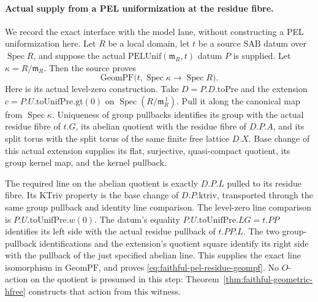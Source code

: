 \paragraph{Actual supply from a PEL uniformization at the residue fibre.}
We record the exact interface with the model lane, without
constructing a PEL uniformization here.
Let \(R\) be a local domain, let \(t\) be a source
\(\mathrm{SAB}\) datum over \(\operatorname{Spec}R\), and
suppose the actual \(\mathrm{PELUnif}(\mathfrak m_R,t)\)
datum \(P\) is supplied.
Let \(\kappa=R/\mathfrak m_R\).
Then the source proves
\[
        \mathrm{GeomPF}
              \bigl(t,\operatorname{Spec}\kappa\to\operatorname{Spec}R\bigr).
 \tag{HF6}\label{eq:faithful-pel-residue-geompf}
\]
Here is its actual level-zero construction.
Take \(D=P.D.\mathrm{toPre}\) and the extension
\(c=P.U.\mathrm{toUnifPre}.\mathrm{gt}(0)\) on
\(\operatorname{Spec}(R/\mathfrak m_R^{\,1})\).
Pull it along the canonical map from \(\operatorname{Spec}\kappa\).
Uniqueness of group pullbacks identifies its group with the
actual residue fibre of \(t.G\), its abelian quotient with
the residue fibre of \(D.P.A\), and its split torus with
the split torus of the same finite free lattice \(D.X\).
Base change of this actual extension supplies its flat,
surjective, quasi-compact quotient, its group kernel map,
and the kernel pullback.

The required line on the abelian quotient is exactly
\(D.P.L\) pulled to its residue fibre.
Its \(\mathrm{KTriv}\) property is the base change of
\(D.P.\mathrm{ktriv}\), transported through the same
group pullback and identity line comparison.
The level-zero line comparison is
\(P.U.\mathrm{toUnifPre}.w(0)\).
The datum's equality
\(P.U.\mathrm{toUnifPre}.LG=t.PP\) identifies its left
side with the actual residue pullback of \(t.PP.L\).
The two group-pullback identifications and the extension's
quotient square identify its right side with the pullback
of the just specified abelian line.
This supplies the exact line isomorphism in
\(\mathrm{GeomPF}\), and proves
\eqref{eq:faithful-pel-residue-geompf}.
No \(O\)-action on the quotient is presumed in this step:
Theorem~\ref{thm:faithful-geometric-hfree} constructs that
action from this witness.

